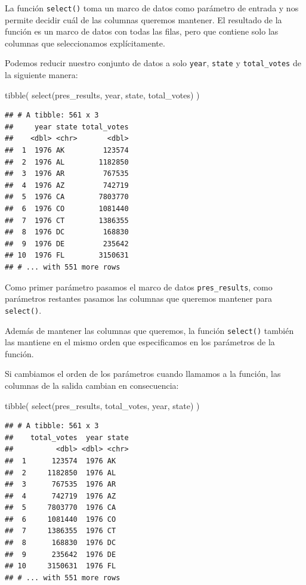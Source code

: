 \documentclass[
]{book}
\newenvironment{Shaded}{\begin{snugshade}}{\end{snugshade}}
\newcommand{\FunctionTok}[1]{\textcolor[rgb]{0.00,0.00,0.00}{#1}}
\newcommand{\NormalTok}[1]{#1}
\begin{document}
La función \texttt{select()} toma un marco de datos como parámetro de entrada y nos permite decidir cuál de las columnas queremos mantener. El resultado de la función es un marco de datos con todas las filas, pero que contiene solo las columnas que seleccionamos explícitamente.

Podemos reducir nuestro conjunto de datos a solo \texttt{year}, \texttt{state} y \texttt{total\_votes} de la siguiente manera:

\begin{Shaded}
\begin{Highlighting}[]
\FunctionTok{tibble}\NormalTok{(}
\FunctionTok{select}\NormalTok{(pres\_results, year, state, total\_votes)}
\NormalTok{)}
\end{Highlighting}
\end{Shaded}

\begin{verbatim}
## # A tibble: 561 x 3
##     year state total_votes
##    <dbl> <chr>       <dbl>
##  1  1976 AK         123574
##  2  1976 AL        1182850
##  3  1976 AR         767535
##  4  1976 AZ         742719
##  5  1976 CA        7803770
##  6  1976 CO        1081440
##  7  1976 CT        1386355
##  8  1976 DC         168830
##  9  1976 DE         235642
## 10  1976 FL        3150631
## # ... with 551 more rows
\end{verbatim}

Como primer parámetro pasamos el marco de datos \texttt{pres\_results}, como parámetros restantes pasamos las columnas que queremos mantener para \texttt{select()}.

Además de mantener las columnas que queremos, la función \texttt{select()} también las mantiene en el mismo orden que especificamos en los parámetros de la función.

Si cambiamos el orden de los parámetros cuando llamamos a la función, las columnas de la salida cambian en consecuencia:

\begin{Shaded}
\begin{Highlighting}[]
\FunctionTok{tibble}\NormalTok{(}
\FunctionTok{select}\NormalTok{(pres\_results, total\_votes, year, state)}
\NormalTok{)}
\end{Highlighting}
\end{Shaded}

\begin{verbatim}
## # A tibble: 561 x 3
##    total_votes  year state
##          <dbl> <dbl> <chr>
##  1      123574  1976 AK   
##  2     1182850  1976 AL   
##  3      767535  1976 AR   
##  4      742719  1976 AZ   
##  5     7803770  1976 CA   
##  6     1081440  1976 CO   
##  7     1386355  1976 CT   
##  8      168830  1976 DC   
##  9      235642  1976 DE   
## 10     3150631  1976 FL   
## # ... with 551 more rows
\end{verbatim}
\end{document}
